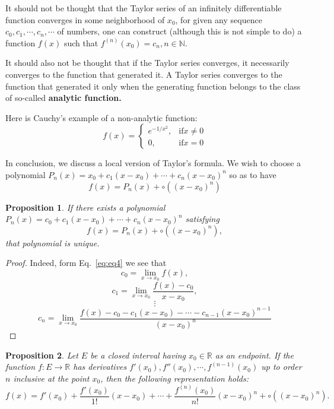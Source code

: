 \documentclass[a4paper,12pt]{article} %
\newtheorem{proposition}{Proposition}[section]
\begin{document}
It should not be thought that the Taylor series of an infinitely 
differentiable function converges in some neighborhood of $x_0$, for 
given any sequence $c_0, c_1, \cdots, c_n, \cdots$ of numbers, one can construct 
(although this is not simple to do) a function $f(x)$ such that 
$f^{(n)}(x_0) = c_n, n \in \mathbb{N}$.

It should also not be thought that if the Taylor series converges,
it necessarily converges to the function that generated it. A Taylor 
series converges to the function that generated it only when the 
generating function belongs to the class of so-called \textbf{analytic function.}

Here is Cauchy's example of a non-analytic function:
\begin{equation}
    f(x) = \left\{\begin{array}{cl} e^{-1/x^2}, & \mathrm{ if } x \ne 0 \\
                              0,      & \mathrm{ if } x = 0
            \end{array}\right.
\end{equation}

In conclusion, we discuss a local version of Taylor's formula.
We wish to choose a polynomial $\displaystyle P_n(x) = x_0 + c_1
(x - x_0) + \cdots + c_n(x - x_0)^n$ so as to have 
\[
    f(x) = P_n(x) + \circ((x - x_0)^n)
    \]
\begin{proposition}
    \normalfont 
    If there exists a polynomial $P_n(x) = c_0 + c_1(x - x_0) + 
    \cdots + c_n(x - x_0)^n$ satisfying 
    \begin{equation}
    f(x) = P_n(x) + \circ((x - x_0)^n),
        \label{eq:eq4}
    \end{equation}
    that polynomial is unique.
\end{proposition}
\begin{proof}
    Indeed, form Eq.~\ref{eq:eq4} we see that 
    \[
        c_0 = \lim_{x \to x_0}f(x),
        \]
    \[
        c_1 = \lim_{x \to x_0}\frac{f(x) - c_0}{x - x_0},
        \]
    \[
        \vdots
        \]
    \[
        c_n = \lim_{x \to x_0}\frac{f(x) - c_0 - c_1(x - x_0) - \cdots - c_{n-1}(x - x_0)^{n-1}}
        {(x - x_0)^n}
        \]
\end{proof}
\begin{proposition}
    \normalfont 
    Let $E$ be a closed interval having $x_0 \in \mathbb{R}$  as an endpoint.
    If the function $f: E \to \mathbb{R}$ has derivatives $f'(x_0), f''(x_0), 
    \cdots, f^{(n-1)}(x_0)$ up to order $n$ inclusive at the point $x_0$, then the 
    following representation holds:
    \begin{equation}
        f(x) = f'(x_0) + \frac{f'(x_0)}{1!}(x - x_0) + \cdots + 
        \frac{f^{(n)}(x_0)}{n!}(x - x_0)^n + \circ\left((x - x_0)^n\right).
        \label{eq:eq5}
    \end{equation}
\end{proposition}
\end{document}

